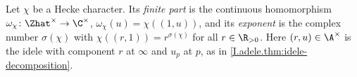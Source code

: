 Let $\chi$ be a Hecke character. Its \emph{finite part} is the continuous homomorphism
$\omega_\chi\colon\Zhat^\times\to\C^\times$, $\omega_\chi(u)=\chi((1,u))$, and its \emph{exponent} is the complex number
$\sigma(\chi)$ with $\chi((r,1))=r^{\sigma(\chi)}$ for all $r\in\R_{>0}$. Here $(r,u)\in\A^\times$ is the idele with
component $r$ at $\infty$ and $u_p$ at $p$, as in \cref{I.adele.thm:idele-decomposition}.
